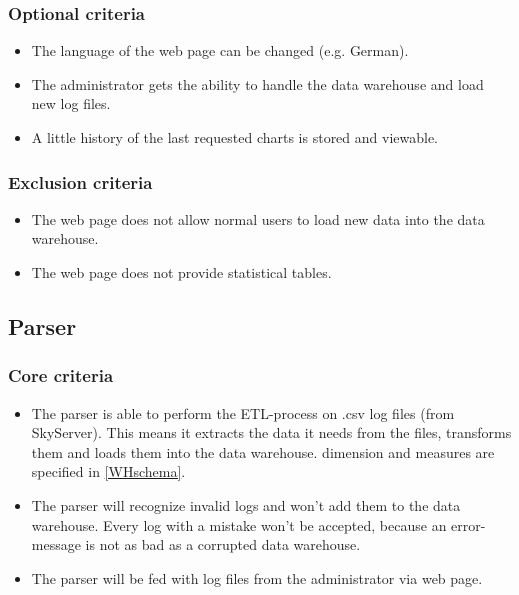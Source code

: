 \subsubsection{Optional criteria}
\begin{itemize}
\item The language of the web page can be changed (e.g. German).

\item The administrator gets the ability to handle the \gls{data warehouse} and load new \glspl{log file}.

\item A little history of the last requested \glspl{chart} is stored and viewable.
\end{itemize}

\subsubsection{Exclusion criteria}
\begin{itemize}
\item The web page does not allow normal users to load new data into the \gls{data warehouse}.

\item The web page does not provide statistical tables. 
\end{itemize}


\subsection{Parser}

\subsubsection{Core criteria} %
\begin{itemize}
\item The \gls{parser} is able to perform the \gls{ETL-process} on \gls{.csv} \glspl{log file}
 (from \gls{SkyServer}). 
This means it extracts the data it needs from the files, transforms them 
and loads them into the \gls{data warehouse}. \gls{dimension} and \glspl{measure} are specified in \ref{WHschema}.
  
\item The \gls{parser} will recognize invalid logs and won't add them to the \gls{data warehouse}.
 Every log with a mistake won't be accepted, because an error-message is not 
 as bad as a corrupted \gls{data warehouse}. 
 
\item The \gls{parser} will be fed with \glspl{log file} from the administrator via web page.
\end{itemize} 

